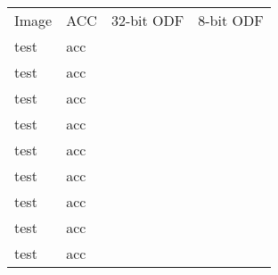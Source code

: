 \documentclass[11pt]{article}
\begin{document}
\begin{center}
  \captionsetup{width=0.9\textwidth}
  \begin{longtable}{M{0.15\textwidth} M{0.15\textwidth} M{0.3\textwidth} M{0.3\textwidth}}
    Image & ACC & 32-bit ODF & 8-bit ODF\\
    test & acc &  & \\
    test & acc &  & \\
    test & acc &  & \\
    test & acc &  & \\
    test & acc &  & \\
    test & acc &  & \\
    test & acc &  & \\
    test & acc &  & \\
    test & acc &  &     
  \end{longtable}
\end{center}
% 
% 
\end{document}
